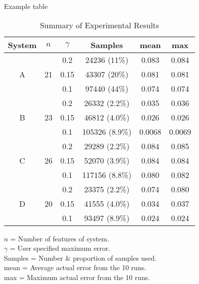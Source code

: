 \documentclass[conference]{IEEEtran} %
\theoremstyle{plain}
\theoremstyle{definition}
\begin{document}
Example table
\begin{table}[h]
\normalsize
\caption{Summary of Experimental Results}
\centering
\begin{tabular}{|c|c|c|c|c|c|}
\hline
System & $n$ &  $\gamma$ & Samples & mean & max \\ \hline
\multirow{3}{*}{A} & \multirow{3}{*}{21} & 0.2 & 24236 (11\%) & 0.083 & 0.084\\
 && 0.15 & 43307 (20\%) & 0.081 & 0.081\\
  && 0.1 & 97440 (44\%)& 0.074 & 0.074\\ \hline
\multirow{3}{*}{B} & \multirow{3}{*}{23}  & 0.2 & 26332 (2.2\%) & 0.035 & 0.036\\
&& 0.15 & 46812 (4.0\%)& 0.026 & 0.026\\
&& 0.1 & 105326 (8.9\%)& 0.0068& 0.0069\\ \hline
\multirow{3}{*}{C} & \multirow{3}{*}{26}&0.2& 29289 (2.2\%) & 0.084 & 0.085\\
& & 0.15 & 52070 (3.9\%)& 0.084 & 0.084\\
 &  & 0.1 & 117156 (8.8\%)& 0.080 & 0.082\\ \hline
 \multirow{3}{*}{D} & \multirow{3}{*}{20} & 0.2 & 23375 (2.2\%)& 0.074 & 0.080\\
&  & 0.15 & 41555 (4.0\%)& 0.034 & 0.037\\
&  & 0.1 & 93497 (8.9\%)& 0.024 & 0.024\\

\hline
\end{tabular}
\label{expone}

\vspace{1em}

\begin{center}
$n$ = Number of features of system.\\
$\gamma$ = User specified maximum error.\\
Samples = Number \& proportion of samples used.\\
mean = Average actual error from the 10 runs.\\
max = Maximum actual error from the 10 runs.
\end{center}

\end{table}

\balance
\nocite{*}

\end{document}
